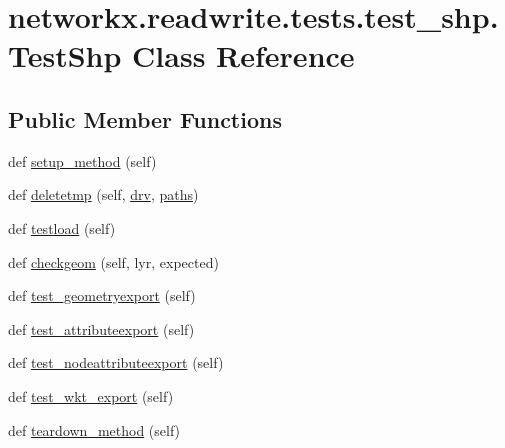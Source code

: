 \hypertarget{classnetworkx_1_1readwrite_1_1tests_1_1test__shp_1_1TestShp}{}\section{networkx.\+readwrite.\+tests.\+test\+\_\+shp.\+Test\+Shp Class Reference}
\label{classnetworkx_1_1readwrite_1_1tests_1_1test__shp_1_1TestShp}
\subsection*{Public Member Functions}
\begin{DoxyCompactItemize}
\item 
def \hyperlink{classnetworkx_1_1readwrite_1_1tests_1_1test__shp_1_1TestShp_a850d38a8cc054679f4db1f3198cba92c}{setup\+\_\+method} (self)
\item 
def \hyperlink{classnetworkx_1_1readwrite_1_1tests_1_1test__shp_1_1TestShp_a1cb806f92946b0c766d3629c653fa277}{deletetmp} (self, \hyperlink{classnetworkx_1_1readwrite_1_1tests_1_1test__shp_1_1TestShp_a93db3b12f425ffe7d2d39c09f84a0883}{drv}, \hyperlink{classnetworkx_1_1readwrite_1_1tests_1_1test__shp_1_1TestShp_af33094990aa8514ef965d355b0ce42bb}{paths})
\item 
def \hyperlink{classnetworkx_1_1readwrite_1_1tests_1_1test__shp_1_1TestShp_a7e329c85a69b0b90dd5cc14c45de58b9}{testload} (self)
\item 
def \hyperlink{classnetworkx_1_1readwrite_1_1tests_1_1test__shp_1_1TestShp_a5ca6241bc161d4aaa1684f8643be1425}{checkgeom} (self, lyr, expected)
\item 
def \hyperlink{classnetworkx_1_1readwrite_1_1tests_1_1test__shp_1_1TestShp_af1922f3ccf553f1f1792c549ce3b82b0}{test\+\_\+geometryexport} (self)
\item 
def \hyperlink{classnetworkx_1_1readwrite_1_1tests_1_1test__shp_1_1TestShp_aa0e802c9de7b6509812f8c6330c773ee}{test\+\_\+attributeexport} (self)
\item 
def \hyperlink{classnetworkx_1_1readwrite_1_1tests_1_1test__shp_1_1TestShp_a94579245b3fac3d36b711afd9197e4af}{test\+\_\+nodeattributeexport} (self)
\item 
def \hyperlink{classnetworkx_1_1readwrite_1_1tests_1_1test__shp_1_1TestShp_a7efe5659f8143bec10c7aaab1559145e}{test\+\_\+wkt\+\_\+export} (self)
\item 
def \hyperlink{classnetworkx_1_1readwrite_1_1tests_1_1test__shp_1_1TestShp_a44347bdfcd58bbc6a190845df1de8d05}{teardown\+\_\+method} (self)
\end{DoxyCompactItemize}
